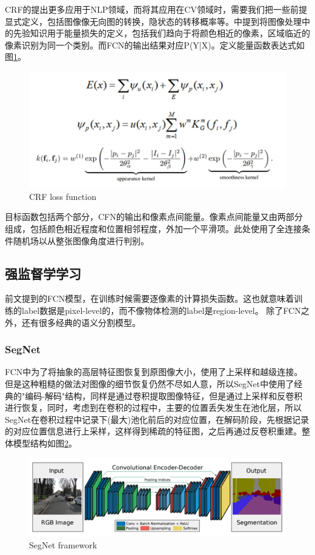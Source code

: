 \documentclass{article}
\begin{document}
\begin{CJK}{UTF8}{gbsn}
CRF\cite{lafferty2001conditional}的提出更多应用于NLP领域，而将其应用在CV领域时，需要我们把一些前提显式定义，包括图像像无向图的转换，隐状态的转移概率等。\cite{krahenbuhl2011efficient}中提到将图像处理中的先验知识用于能量损失的定义，包括我们趋向于将颜色相近的像素，区域临近的像素识别为同一个类别。而FCN\cite{long2015fully}的输出结果对应P(Y|X)。定义能量函数表达式如图\ref{CRF}。
\begin{figure}[h]
    \centering
    \includegraphics[scale=0.7]{imgs/formula_2-2_function_of_CRF_in_CV.png}
    \caption{CRF loss function}
    \label{CRF}
\end{figure}

目标函数包括两个部分，CFN\cite{long2015fully}的输出和像素点间能量。像素点间能量又由两部分组成，包括颜色相近程度和位置相邻程度，外加一个平滑项。此处使用了全连接条件随机场以从整张图像角度进行判别。

\subsection{强监督学学习}
\label{strong}
前文提到的FCN\cite{long2015fully}模型，在训练时候需要逐像素的计算损失函数。这也就意味着训练的label数据是pixel-level的，而不像物体检测的label是region-level。
	除了FCN\cite{long2015fully}之外，还有很多经典的语义分割模型。
\subsubsection{SegNet}
FCN\cite{long2015fully}中为了将抽象的高层特征图恢复到原图像大小，使用了上采样和越级连接。但是这种粗糙的做法对图像的细节恢复仍然不尽如人意，所以SegNet\cite{badrinarayanan2017segnet}中使用了经典的"编码-解码"结构，同样是通过卷积提取图像特征，但是通过上采样和反卷积进行恢复，同时，考虑到在卷积的过程中，主要的位置丢失发生在池化层，所以SegNet\cite{badrinarayanan2017segnet}在卷积过程中记录下(最大)池化前后的对应位置，在解码阶段，先根据记录的对应位置信息进行上采样，这样得到稀疏的特征图，之后再通过反卷积重建。整体模型结构如图\ref{SegNet}。
\begin{figure}[h]
    \centering
    \includegraphics[scale=0.7]{imgs/2-3_SegNet_framework.png}
    \caption{SegNet framework}
    \label{SegNet}
\end{figure}


\end{CJK}
\end{document}
